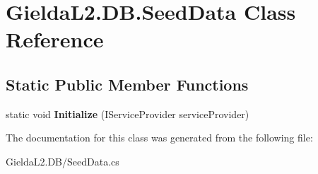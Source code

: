 \hypertarget{class_gielda_l2_1_1_d_b_1_1_seed_data}{}\section{Gielda\+L2.\+D\+B.\+Seed\+Data Class Reference}
\label{class_gielda_l2_1_1_d_b_1_1_seed_data}
\subsection*{Static Public Member Functions}
\begin{DoxyCompactItemize}
\item 
\mbox{\label{class_gielda_l2_1_1_d_b_1_1_seed_data_ab4c603057c8d66e5afb0b1874daef742}} 
static void {\bfseries Initialize} (I\+Service\+Provider service\+Provider)
\end{DoxyCompactItemize}


The documentation for this class was generated from the following file\+:\begin{DoxyCompactItemize}
\item 
Gielda\+L2.\+D\+B/Seed\+Data.\+cs\end{DoxyCompactItemize}

